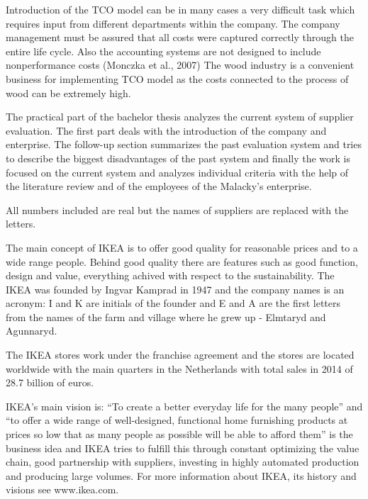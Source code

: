 \documentclass[oneside,12pt]{article}%
\begin{document}
Introduction of the TCO model can be in many cases a very difficult task which requires input from different departments within the company. The company management must be assured that all costs were captured correctly through the entire life cycle. Also the accounting systems are not designed to include nonperformance costs (Monczka et al., 2007) The wood industry is a convenient business for implementing TCO model as the costs connected to the process of wood can be extremely high.





The practical part of the bachelor thesis analyzes the current system of supplier evaluation. The first part deals with the introduction of the company and enterprise. The follow-up section summarizes the past evaluation system and tries to describe the biggest disadvantages of the past system and finally the work is focused on the current system and analyzes individual criteria with the help of the literature review and of the employees of the Malacky’s enterprise. \par
All numbers included are real but the names of suppliers are replaced with the letters.

The main concept of IKEA is to offer good quality for reasonable prices and to a wide range people. Behind good quality there are features such as good function, design and value, everything achived with respect to the sustainability. The IKEA was founded by Ingvar Kamprad in 1947 and the company names is an acronym: I and K are initials of the founder and E and A are the first letters from the names of the farm and village where he grew up - Elmtaryd and Agunnaryd. \par
The IKEA stores work under the franchise agreement and the stores are located worldwide with the main quarters in the Netherlands with total sales in 2014 of 28.7 billion of euros. \par
IKEA’s main vision is: “To create a better everyday life for the many people” and “to offer a wide range of well-designed, functional home furnishing products at prices so low that as many people as possible will be able to afford them” is the business idea and IKEA tries to fulfill this through constant optimizing the value chain, good partnership with suppliers, investing in highly automated production and producing large volumes. For more information about IKEA, its history and visions see www.ikea.com.
\end{document}
